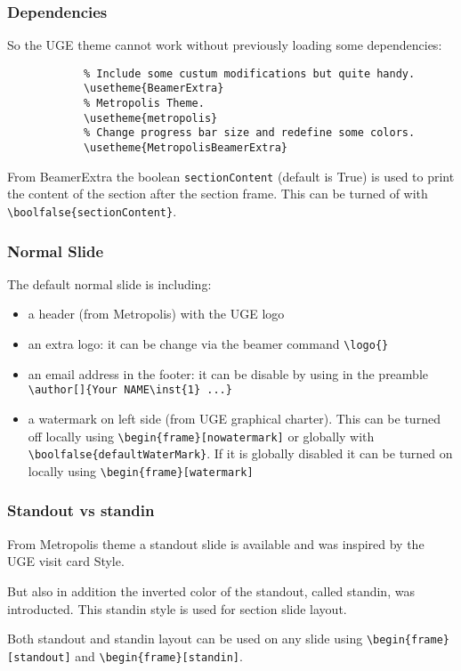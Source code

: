 	\begin{frame}[fragile]
		\frametitle{Dependencies}

		So the UGE theme cannot work without previously loading some dependencies:
		\begin{verbatim}
			% Include some custum modifications but quite handy.
			\usetheme{BeamerExtra}
			% Metropolis Theme.
			\usetheme{metropolis}
			% Change progress bar size and redefine some colors.
			\usetheme{MetropolisBeamerExtra}
		\end{verbatim}
		\bigskip

		From BeamerExtra the boolean \verb|sectionContent| (default is True) is used to print the content of the section after the section frame. 
		This can be turned of with \verb|\boolfalse{sectionContent}|.
	\end{frame}


	\begin{frame}
		\frametitle{Normal Slide}

		The default normal slide is including:
		\begin{itemize}
			\item a header (from Metropolis) with the UGE logo
			\item an extra logo: it can be change via the beamer command \verb|\logo{}|
			\item an email address in the footer: it can be disable by using in the preamble 
				\verb|\author[]{Your NAME\inst{1} ...}|
			\item a watermark on left side (from UGE graphical charter). This can be turned off locally using \verb|\begin{frame}[nowatermark]| or globally with \verb|\boolfalse{defaultWaterMark}|. If it is globally disabled it can be turned on locally using \verb|\begin{frame}[watermark]|
		\end{itemize}
	\end{frame}


	\begin{frame}
		\frametitle{Standout vs standin}

		From Metropolis theme a standout slide is available and was inspired by the UGE visit card Style.
		
		But also in addition the inverted color of the standout, called standin, was introducted.
		This standin style is used for section slide layout.
		
		Both standout and standin layout can be used on any slide using 
		\verb|\begin{frame}[standout]| and \verb|\begin{frame}[standin]|.
	\end{frame}



